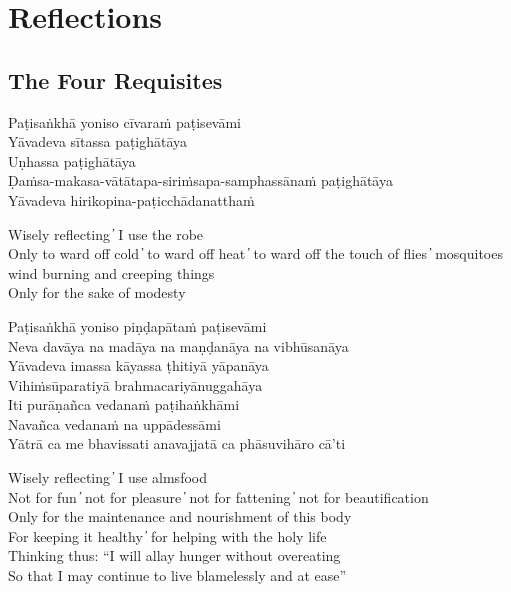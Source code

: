\chapter{Reflections}

\section{The Four Requisites}

\begin{leader}
\end{leader}

Paṭisaṅkhā yoniso cīvaraṁ paṭisevāmi\\
Yāvadeva sītassa paṭighātāya\\
Uṇhassa paṭighātāya\\
Ḍaṁsa-makasa-vātātapa-siriṁsapa-samphassānaṁ paṭighātāya\\
Yāvadeva hirikopina-paṭicchādanatthaṁ

\begin{english}
Wisely reflecting  ̓  I use the robe\\
Only to ward off cold  ̓  to ward off heat  ̓  to ward off the touch of flies  ̓  mosquitoes wind burning and creeping things\\
Only for the sake of modesty
\end{english}

Paṭisaṅkhā yoniso piṇḍapātaṁ paṭisevāmi\\
Neva davāya na madāya na maṇḍanāya na vibhūsanāya\\
Yāvadeva imassa kāyassa ṭhitiyā yāpanāya\\
Vihiṁsūparatiyā brahmacariyānuggahāya\\
Iti purāṇañca vedanaṁ paṭihaṅkhāmi\\
Navañca vedanaṁ na uppādessāmi\\
Yātrā ca me bhavissati anavajjatā ca phāsuvihāro cā’ti

\begin{english}
Wisely reflecting  ̓  I use almsfood\\
Not for fun  ̓  not for pleasure  ̓  not for fattening  ̓  not for beautification\\
Only for the maintenance and nourishment of this body\\
For keeping it healthy  ̓  for helping with the holy life\\
Thinking thus: “I will allay hunger without overeating\\
So that I may continue to live blamelessly and at ease”
  \end{english}

